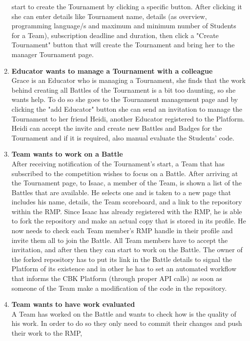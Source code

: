 \begin{enumerate}[label= \textbf{SC\arabic*}]
    start to create the Tournament by clicking a specific button. After clicking it she can enter details like Tournament name, details (as overview, programming language/s and maximum and minimum number of Students for a Team),
    subscription deadline and duration, then click a "Create Tournament" button that will create the Tournament and bring her to the manager Tournament page. 
    \item \textbf{Educator wants to manage a Tournament with a colleague} \label{sc:sc6}\\ Grace is an Educator who is managing a Tournament, she finds that the work behind creating all Battles of the Tournament is a bit too daunting, so she wants 
    help. To do so she goes to the Tournament management page and by clicking the "add Educator" button she can send an invitation to manage the Tournament to her friend Heidi, another Educator registered to the Platform. Heidi 
    can accept the invite and create new Battles and Badges for the Tournament and if it is required, also manual evaluate the Students' code.
    \item \textbf{Team wants to work on a Battle} \label{sc:sc7} \\ After receiving notification of the Tournament's start, a Team that has subscribed to the competition wishes to focus on a Battle. After arriving at the Tournament page, to Isaac, 
    a member of the Team, is shown a list of the Battles that are available. He selects one and is taken to a new page that includes his name, details, the Team scoreboard, and a link to the repository within the RMP. Since Isaac 
    has already registered with the RMP, he is able to fork the repository and make an actual copy that is stored in its profile. He now needs to check each Team member's RMP handle in their profile and invite them all to join the 
    Battle. All Team members have to accept the invitation, and after then they can start to work on the Battle. The owner of the forked repository has to put its link in the Battle details to signal the Platform of its existence and in
    other he has to set an automated workflow that informs the CBK Platform (through proper API calls) as soon as someone of the Team make a modification of the code in the repository.
    \item \textbf{Team wants to have work evaluated} \label{sc:sc8} \\ A Team has worked on the Battle and wants to check how is the quality of his work. In order to do so they only need to commit their changes and push their work to the RMP, 

\end{enumerate}
